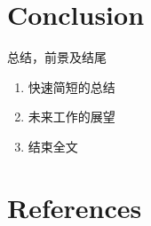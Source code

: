 \documentclass{article}
\begin{document}
\begin{large}
\section{Conclusion}

总结，前景及结尾
\begin{enumerate}
\item 快速简短的总结
\item 未来工作的展望
\item 结束全文
\end{enumerate}

\section{References}

\end{large}
\end{document}
